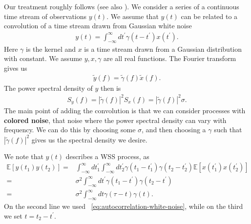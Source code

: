 Our treatment roughly follows \cite{Creighton:2011zz} (see also \cite{Finn:1992wt}).
We consider a series of a continuous time stream of observations $y\left(t\right)$.
We assume that $y\left(t\right)$ can be related to a convolution of
a time stream drawn from Gaussian white noise
\begin{align}
    y\left(t\right)
    =
    \int_{-\infty}^{\infty}dt^{\prime}\gamma\left(t-t^{\prime}\right)x\left(t^{\prime}\right)
    .
\end{align}
Here $\gamma$ is the kernel and $x$ is a time stream drawn from a Gaussian
distribution with constant.
We assume $y,x,\gamma$ are all real functions.
The Fourier transform gives us
\begin{align}
    \tilde{y}\left(f\right)
    =
    \tilde{\gamma}\left(f\right)\tilde{x}\left(f\right)
    .
\end{align}
The power spectral density of $y$ then is
\begin{align}
    S_{y}\left(f\right)
    =
    \left|\tilde{\gamma}\left(f\right)\right|^2S_x\left(f\right)
    =
    \left|\tilde{\gamma}\left(f\right)\right|^2\sigma
    .
\end{align}
The main point of adding the convolution is that we can consider processes
with \textbf{colored noise}, that noise where the power spectral density
can vary with frequency. We can do this by choosing some $\sigma$, and
then choosing a $\gamma$ such that $|\tilde{\gamma}\left(f\right)|^2$
gives us the spectral density we desire.

We note that $y\left(t\right)$ describes a WSS process, as
\begin{align}
    \mathbb{E}\left[y\left(t_1\right)y\left(t_2\right)\right]
    =&
    \int_{-\infty}^{\infty}dt_1^{\prime}
    \int_{-\infty}^{\infty}dt_2^{\prime}
        \gamma\left(t_1-t_1^{\prime}\right)
        \gamma\left(t_2-t_2^{\prime}\right)
        \mathbb{E}\left[x\left(t_1^{\prime}\right)x\left(t_2^{\prime}\right)\right]
    \nonumber\\
    =&
    \sigma^2
    \int_{-\infty}^{\infty}dt^{\prime}
        \gamma\left(t_1-t^{\prime}\right)
        \gamma\left(t_2-t^{\prime}\right)
    \nonumber\\
    =&
    \sigma^2
    \int_{-\infty}^{\infty}dt
        \gamma\left(\tau-t\right)
        \gamma\left(t\right)
    .
\end{align}
On the second line we used ~\eqref{eq:autocorrelation-white-noise},
while on the third we set $t=t_2-t^{\prime}$.

